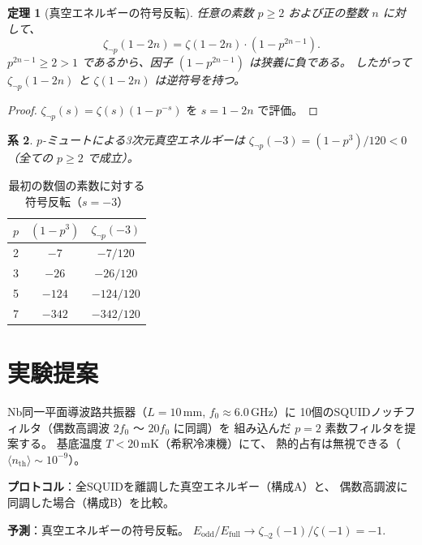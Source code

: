 \documentclass[11pt,a4paper]{article}
\newtheorem{theorem}{定理}[section]
\newtheorem{corollary}[theorem]{系}
\begin{document}
\begin{theorem}[真空エネルギーの符号反転]
\label{thm:sign_flip}
任意の素数 $p \geq 2$ および正の整数 $n$ に対して、
\begin{equation}
  \zeta_{\neg p}(1-2n) = \zeta(1-2n)\cdot(1 - p^{2n-1}).
\end{equation}
$p^{2n-1} \geq 2 > 1$ であるから、因子 $(1-p^{2n-1})$ は狭義に負である。
したがって $\zeta_{\neg p}(1-2n)$ と $\zeta(1-2n)$ は逆符号を持つ。
\end{theorem}

\begin{proof}
$\zeta_{\neg p}(s) = \zeta(s)(1-p^{-s})$ を $s = 1-2n$ で評価。
\end{proof}

\begin{corollary}
$p$-ミュートによる3次元真空エネルギーは
$\zeta_{\neg p}(-3) = (1-p^3)/120 < 0$（全ての $p \geq 2$ で成立）。
\end{corollary}

\begin{table}[h]
\centering
\caption{最初の数個の素数に対する符号反転（$s=-3$）}
\begin{tabular}{@{}ccc@{}}
\toprule
$p$ & $(1-p^3)$ & $\zeta_{\neg p}(-3)$ \\
\midrule
2 & $-7$ & $-7/120$ \\
3 & $-26$ & $-26/120$ \\
5 & $-124$ & $-124/120$ \\
7 & $-342$ & $-342/120$ \\
\bottomrule
\end{tabular}
\end{table}

\section{実験提案}

Nb同一平面導波路共振器（$L = 10\,$mm, $f_0 \approx 6.0\,$GHz）に
10個のSQUIDノッチフィルタ（偶数高調波 $2f_0$ 〜 $20f_0$ に同調）を
組み込んだ $p=2$ 素数フィルタを提案する。
基底温度 $T < 20\,$mK（希釈冷凍機）にて、
熱的占有は無視できる（$\langle n_{\mathrm{th}}\rangle \sim 10^{-9}$）。

\textbf{プロトコル}：全SQUIDを離調した真空エネルギー（構成A）と、
偶数高調波に同調した場合（構成B）を比較。

\textbf{予測}：真空エネルギーの符号反転。
$E_{\mathrm{odd}}/E_{\mathrm{full}} \to \zeta_{\neg 2}(-1)/\zeta(-1) = -1$.
\end{document}
